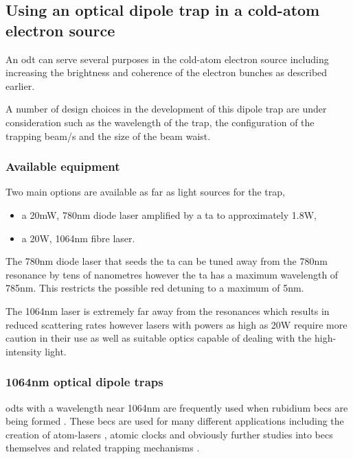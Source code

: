 \subsection{Using an optical dipole trap in a cold-atom electron source}
An \gls{odt} can serve several purposes in the cold-atom electron source including increasing the brightness and coherence of the electron bunches as described earlier.

A number of design choices in the development of this dipole trap are under consideration such as the wavelength of the trap, the configuration of the trapping beam/s and the size of the beam waist.

\subsubsection{Available equipment}
Two main options are available as far as light sources for the trap,
\begin{itemize}
    \item a 20mW, 780nm diode laser amplified by a \gls{ta} to approximately 1.8W,
    \item a 20W, 1064nm fibre laser.
\end{itemize}

The 780nm diode laser that seeds the \gls{ta} can be tuned away from the 780nm resonance by tens of nanometres however the \gls{ta} has a maximum wavelength of 785nm. This restricts the possible red detuning to a maximum of 5nm.

The 1064nm laser is extremely far away from the resonances which results in reduced scattering rates however lasers with powers as high as 20W require more caution in their use as well as suitable optics capable of dealing with the high-intensity light.

\subsubsection{1064nm optical dipole traps}
\Glspl{odt} with a wavelength near 1064nm are frequently used when rubidium \glspl{bec} are being formed \cite{chikkatur_continuous_2002, couvert_quasi-monomode_2008, kleine_buning_slow_2010, lin_rapid_2009, arnold_all-optical_2011, fu_bose-einstein_2011}. These \glspl{bec} are used for many different applications including the creation of atom-lasers \cite{kleine_buning_slow_2010, chikkatur_continuous_2002, couvert_quasi-monomode_2008}, atomic clocks\cite{kleine_buning_extended_2011} and obviously further studies into \glspl{bec} themselves and related trapping mechanisms \cite{arnold_all-optical_2011, fu_bose-einstein_2011, lin_rapid_2009}.

